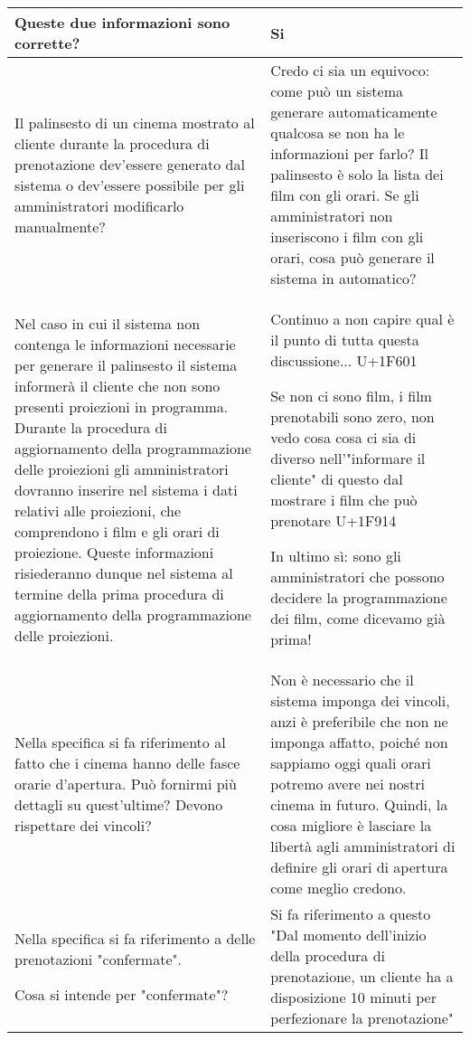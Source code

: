 \begin{longtable}{|p{8.15cm}|p{8.15cm}|}
    Queste due informazioni sono corrette?
     & Si
    \\\hline
    Il palinsesto di un cinema mostrato al cliente durante la procedura di
    prenotazione dev'essere generato dal sistema o dev'essere possibile per
    gli amministratori modificarlo manualmente?
     & Credo ci sia un equivoco: come può un sistema generare automaticamente
    qualcosa se non ha le informazioni per farlo? Il palinsesto è solo la
    lista dei film con gli orari. Se gli amministratori non inseriscono i
    film con gli orari, cosa può generare il sistema in automatico?
    \\\hline
    Nel caso in cui il sistema non contenga le informazioni necessarie per
    generare il palinsesto il sistema informerà il cliente che non sono
    presenti proiezioni in programma.
    Durante la procedura di aggiornamento della programmazione delle
    proiezioni gli amministratori dovranno inserire nel sistema i dati relativi
    alle proiezioni, che comprendono i film e gli orari di proiezione.
    Queste informazioni risiederanno dunque nel sistema al termine della prima
    procedura di aggiornamento della programmazione delle proiezioni.
     & Continuo a non capire qual è il punto di tutta questa discussione...
    U+1F601

    Se non ci sono film, i film prenotabili sono zero, non vedo cosa cosa ci
    sia di diverso nell'"informare il cliente" di questo dal mostrare i film
    che può prenotare U+1F914

    In ultimo sì: sono gli amministratori che possono decidere la
    programmazione dei film, come dicevamo già prima!
    \\\hline
    Nella specifica si fa riferimento al fatto che i cinema hanno delle
    fasce orarie d'apertura. Può fornirmi più dettagli su quest'ultime?
    Devono rispettare dei vincoli?
     & Non è necessario che il sistema imponga dei vincoli, anzi è preferibile
    che non ne imponga affatto, poiché non sappiamo oggi quali orari potremo
    avere nei nostri cinema in futuro.
    Quindi, la cosa migliore è lasciare la libertà agli amministratori di
    definire gli orari di apertura come meglio credono.
    \\\hline
    Nella specifica si fa riferimento a delle prenotazioni "confermate".

    Cosa si intende per "confermate"?
     & Si fa riferimento a questo
    "Dal momento dell’inizio della procedura di prenotazione, un cliente ha
    a disposizione 10 minuti per perfezionare la prenotazione"


\end{longtable}
